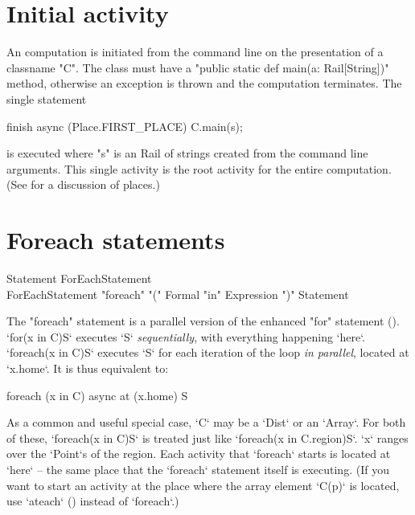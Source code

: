 \section{Initial activity}\label{initial-computation}

An \Xten{} computation is initiated from the command line on the
presentation of a classname \xcd"C". The class must have a
\xcd"public static def main(a: Rail[String])" method, otherwise an
exception is thrown
and the computation terminates.  The single statement
\begin{xten}
finish async (Place.FIRST_PLACE) {
  C.main(s);
}
\end{xten} 
\noindent is executed where \xcd"s" is an Rail of strings created
from the command line arguments. This single activity is the root activity
for the entire computation. (See  for a discussion of
places.)


\section{Foreach statements}\label{foreach-section}


\begin{grammar}
Statement \: ForEachStatement \\
ForEachStatement \: 
      \xcd"foreach" \xcd"(" Formal \xcd"in" Expression \xcd")"
          Statement 
\end{grammar}


The \xcd"foreach" statement is a parallel version of the enhanced \xcd"for"
statement (). \xcd`for(x in C)S` executes \xcd`S` {\em
  sequentially}, with everything happening \xcd`here`. \xcd`foreach(x in C)S`
executes \xcd`S` for each iteration of the loop {\em in parallel}, located at
\xcd`x.home`. It is thus equivalent to:
\begin{xten}
foreach (x in C)
  async at (x.home) S
\end{xten}

As a common and useful special case, \xcd`C` may be a \xcd`Dist` or an
\xcd`Array`.  For both of these, \xcd`foreach(x in C)S` is treated just like 
\xcd`foreach(x in C.region)S`.  \xcd`x` ranges over the \xcd`Point`s of the
region.  Each activity that \xcd`foreach` starts is located at \xcd`here` --
the same place that the \xcd`foreach` statement itself is executing.  (If you
want to start an activity at the place where the array element \xcd`C(p)` is
located, use \xcd`ateach` () instead of \xcd`foreach`.)

